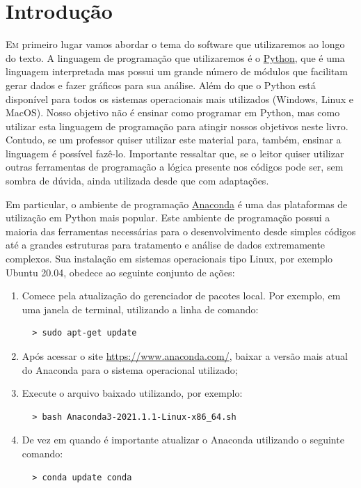 \documentclass[12pt,openright,twoside,english,brazil]{abntex2}
\begin{document}
\chapter*[Introdução]{Introdução}
\lettrine[nindent=0.35em,lhang=0.40,loversize=0.3]{E}{m} primeiro lugar vamos abordar o tema do software que utilizaremos ao longo do texto. A linguagem de programação que utilizaremos é o \href{https://www.python.org}{Python}, que é uma linguagem interpretada mas possui um grande número de módulos que facilitam gerar dados e fazer gráficos para sua análise. Além do que o Python está disponível para todos os sistemas operacionais mais utilizados (Windows, Linux e MacOS). Nosso objetivo não é ensinar como programar em Python, mas como utilizar esta linguagem de programação para atingir nossos objetivos neste livro. Contudo, se um professor quiser utilizar este material para, também, ensinar a linguagem é possível fazê-lo. Importante ressaltar que, se o  leitor quiser utilizar outras ferramentas de programação a lógica presente nos códigos pode ser, sem sombra de dúvida, ainda utilizada desde que com adaptações.

Em particular, o ambiente de programação \href{https://www.anaconda.com}{Anaconda} é uma das plataformas de utilização em Python mais popular. Este ambiente de programação possui a maioria das ferramentas necessárias para o desenvolvimento desde simples códigos até a grandes estruturas para tratamento e análise de dados extremamente complexos. Sua instalação em sistemas operacionais tipo Linux, por exemplo Ubuntu 20.04, obedece ao seguinte conjunto de ações:
\begin{enumerate}
 \item Comece pela atualização do gerenciador de pacotes local. Por exemplo, em uma janela de terminal, utilizando a linha de comando: 
 \begin{verbatim}
  > sudo apt-get update  
 \end{verbatim}
 \vspace{-1.0cm}
 \item Após acessar o site \url{https://www.anaconda.com/}, baixar a versão mais atual do Anaconda para o sistema operacional utilizado;
 \item Execute o arquivo baixado utilizando, por exemplo:
 \begin{verbatim}
  > bash Anaconda3-2021.1.1-Linux-x86_64.sh
 \end{verbatim}
 \vspace{-1.0cm}
 \item De vez em quando é importante atualizar o Anaconda utilizando o seguinte comando:
 \begin{verbatim}
  > conda update conda
 \end{verbatim}
 \vspace{-1.0cm}
\end{enumerate}
\end{document}
